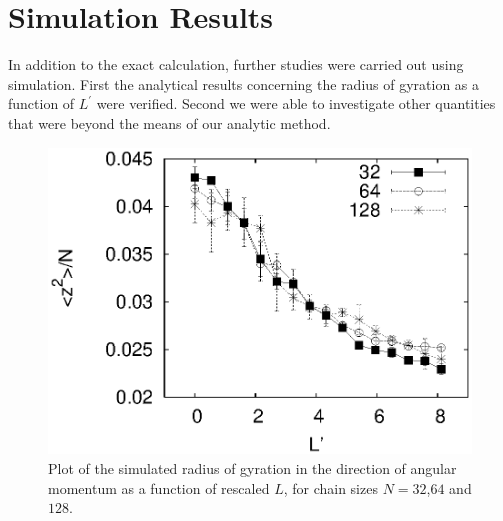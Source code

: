 \documentclass[11pt]{ucthesis}
\begin{document}
\section{Simulation Results}
\label{sec:simresults}
In addition to the exact calculation, further studies were carried out using simulation. First the analytical results concerning the radius of gyration as a function of $L^\prime$ were verified. Second we were able to investigate other quantities that were beyond the means of our analytic method.

\begin{figure}
\begin{center}
\includegraphics[width=\hsize]{zsq}
\caption{Plot of the simulated radius of gyration in the direction of angular momentum as a function of rescaled $L$, for chain sizes $N=32$,$64$ and $128$. }
\label{fig:zsq}
\end{center}
\end{figure}
\end{document}
